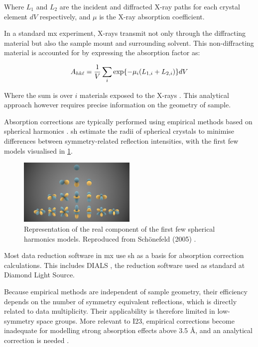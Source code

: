 Where $L_1$ and $L_2$ are the incident and diffracted X-ray paths for each crystal element $dV$ respectively, and $\mu$ is the X-ray absorption coefficient. \cite{Busing1957}

In a standard \ac{mx} experiment, X-rays transmit not only through the diffracting material but also the sample mount and surrounding solvent. This non-diffracting material is accounted for by expressing the absorption factor as:

\begin{equation}
    A_{hk\ell} = \frac{1}{V} \sum_i \exp{-\mu_i (L_{1,i}+L_{2,i})} dV
    \label{AbsFactor_allmaterials}
\end{equation}

Where the sum is over $i$ materials exposed to the X-rays \cite{Santoro1968}. This analytical approach however requires precise information on the geometry of sample.

Absorption corrections are typically performed using empirical methods based on spherical harmonics \cite{Blessing1995}. \ac{sh} estimate the radii of spherical crystals to minimise differences between symmetry-related reflection intensities, with the first few models visualised in \cref{fig:SH}. %


\begin{figure}
    \centering
    \includegraphics[trim={3cm 0 3cm 0},clip,width = 0.5\textwidth]{images/Spherical_Harmonics.png}
    \caption{Representation of the real component of the first few spherical harmonics models. Reproduced from Schönefeld (2005) \cite{Schoenefeld2005}.}
    \label{fig:SH}
\end{figure}

Most data reduction software in \ac{mx} use \ac{sh} as a basis for absorption correction calculations. This includes DIALS \cite{Winter2018}, the reduction software used as standard at Diamond Light Source.

Because empirical methods are independent of sample geometry, their efficiency depends on the number of symmetry equivalent reflections, which is directly related to data multiplicity. Their applicability is therefore limited in low-symmetry space groups. More relevant to I23, empirical corrections become inadequate for modelling strong absorption effects above 3.5 Å, and an analytical correction is needed \cite{Kazantsev2021}.

